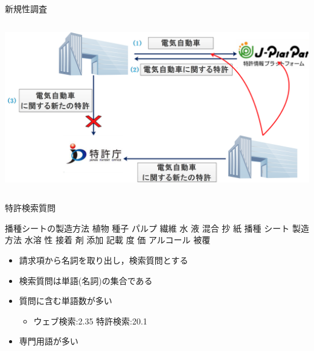 \documentclass[14pt,xcolor=dvipsnames,table,dvipdfmx]{beamer}
\begin{document}
\begin{frame}{新規性調査}
\begin{columns}[t]
    \begin{column}{0.8\textwidth} %
      	\includegraphics[width=\columnwidth]{rk2.png}
    \end{column}
\end{columns}
\end{frame}

\begin{frame}{特許検索質問}
	\fontsize{10pt}{7.2}\selectfont
	\begin{exampleblock}{播種シートの製造方法}
		植物 種子 パルプ 繊維 水 液 混合 抄 紙 播種 シート 製造 方法 水溶 性 接着 剤 添加 記載 度 価 アルコール 被覆
	\end{exampleblock}
	\fontsize{14pt}{7.2}\selectfont
	\begin{block}{}
    \begin{itemize}
		\item 請求項から名詞を取り出し，検索質問とする
        \item 検索質問は単語(名詞)の集合である
        \item 質問に含む単語数が多い
		\begin{itemize}
			\item ウェブ検索:2.35 特許検索:20.1
		\end{itemize}
		\item 専門用語が多い
    \end{itemize}
	\end{block}
\end{frame}
\end{document}
